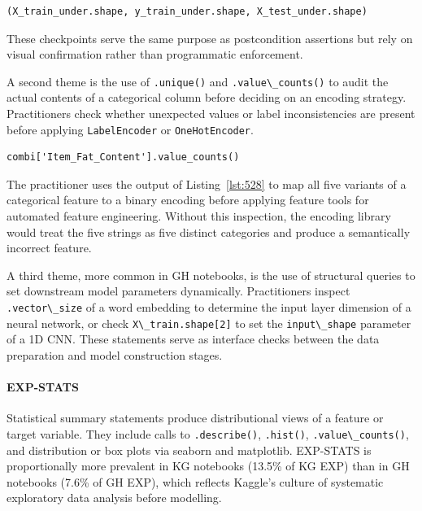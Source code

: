 \begin{lstlisting}[caption={}, label={lst:593}]
(X_train_under.shape, y_train_under.shape, X_test_under.shape)
\end{lstlisting}

These checkpoints serve the same purpose as postcondition assertions
but rely on visual confirmation
rather than programmatic enforcement.

A second theme is the use of \lstinline{.unique()} and \lstinline{.value\_counts()}
to audit the actual contents of a categorical column
before deciding on an encoding strategy.
Practitioners check whether unexpected values or label inconsistencies
are present before applying \lstinline{LabelEncoder} or \lstinline{OneHotEncoder}.

\begin{lstlisting}[caption={}, label={lst:528}]
combi['Item_Fat_Content'].value_counts()
\end{lstlisting}

The practitioner uses the output of Listing~\ref{lst:528}
to map all five variants of a categorical feature
to a binary encoding
before applying feature tools
for automated feature engineering.
Without this inspection,
the encoding library would treat the five strings as five distinct categories
and produce a semantically incorrect feature.

A third theme,
more common in GH notebooks,
is the use of structural queries to set downstream model parameters dynamically.
Practitioners inspect \lstinline{.vector\_size} of a word embedding
to determine the input layer dimension of a neural network,
or check \lstinline{X\_train.shape[2]}
to set the \lstinline{input\_shape} parameter of a 1D CNN.
These statements serve as interface checks
between the data preparation and model construction stages.

\paragraph{EXP-STATS}

Statistical summary statements
produce distributional views of a feature or target variable.
They include calls to \lstinline{.describe()},
\lstinline{.hist()},
\lstinline{.value\_counts()},
and distribution or box plots via seaborn and matplotlib.
EXP-STATS is proportionally more prevalent in KG notebooks (13.5\% of KG EXP)
than in GH notebooks (7.6\% of GH EXP),
which reflects Kaggle's culture of systematic exploratory data analysis before modelling.

